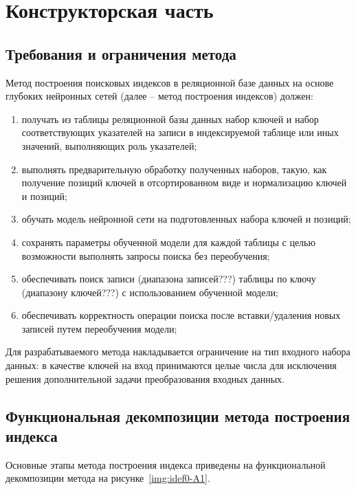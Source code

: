 \chapter{\label{design}Конструкторская часть}

\section{Требования и ограничения метода}

Метод построения поисковых индексов в реляционной базе данных на основе глубоких
нейронных сетей (далее – метод построения индексов) должен:

\begin{enumerate}
    \item получать из таблицы реляционной базы данных набор ключей и набор
        соответствующих указателей на записи в индексируемой таблице или иных
        значений, выполняющих роль указателей;
    \item выполнять предварительную обработку полученных наборов, такую, как
        получение позиций ключей в отсортированном виде и нормализацию ключей и
        позиций;
    \item обучать модель нейронной сети на подготовленных набора ключей и
        позиций;
    \item сохранять параметры обученной модели для каждой таблицы с целью
        возможности выполнять запросы поиска без переобучения;
    \item обеспечивать поиск записи (диапазона записей???) таблицы по ключу
        (диапазону ключей???)  с использованием обученной модели;
    \item обеспечивать корректность операции поиска после вставки/удаления новых
        записей путем переобучения модели;
\end{enumerate}

Для разрабатываемого метода накладывается ограничение на тип входного набора
данных: в качестве ключей на вход принимаются целые числа для исключения решения
дополнительной задачи преобразования входных данных.

\section{Функциональная декомпозиции метода построения индекса}

Основные этапы метода построения индекса приведены на функциональной
декомпозиции метода на рисунке~\ref{img:idef0-A1}.


